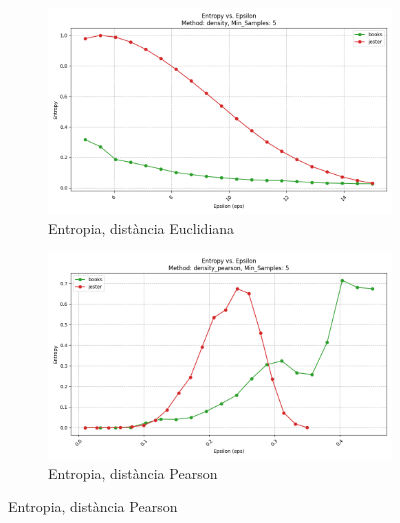 \documentclass[a4paper,12pt]{report}
\begin{document}
\begin{figure}[H]
    \begin{subfigure}[b]{0.49\textwidth}
        \includegraphics[width=\textwidth]{Figuras/DBSCAN/res/books_jester_density_entropy_vs_eps.png}
        \caption{Entropia, distància Euclidiana}
        \label{fig:dbscan2-clustering-results-e}
    \end{subfigure}
    \hfill
    \begin{subfigure}[b]{0.49\textwidth}
        \includegraphics[width=\textwidth]{Figuras/DBSCAN/res/books_jester_density_pearson_entropy_vs_eps.png}
        \caption{Entropia, distància Pearson}
        \label{fig:dbscan2-clustering-results-f}
    \end{subfigure}


\end{figure}
\end{document}
